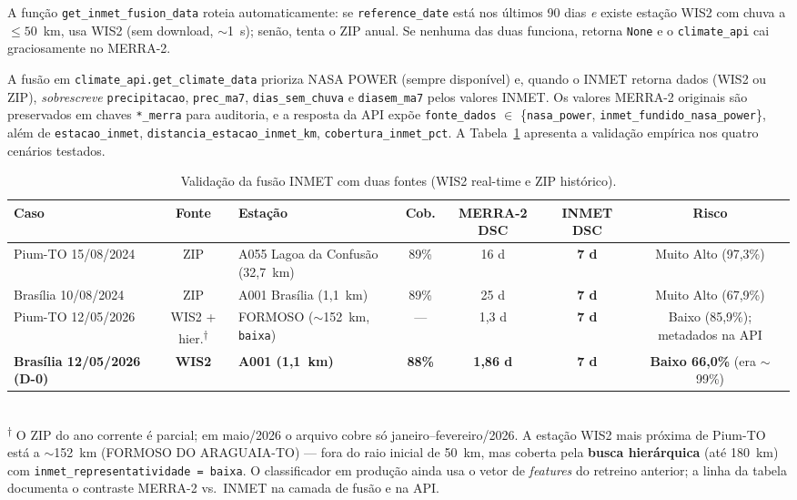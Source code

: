 A função \texttt{get\_inmet\_fusion\_data} roteia automaticamente: se \texttt{reference\_date} está nos últimos 90 dias \emph{e} existe estação WIS2 com chuva a $\leq 50$~km, usa WIS2 (sem download, $\sim$1~s); senão, tenta o ZIP anual. Se nenhuma das duas funciona, retorna \texttt{None} e o \texttt{climate\_api} cai graciosamente no MERRA-2.

A fusão em \texttt{climate\_api.get\_climate\_data} prioriza NASA POWER (sempre disponível) e, quando o INMET retorna dados (WIS2 ou ZIP), \emph{sobrescreve} \texttt{precipitacao}, \texttt{prec\_ma7}, \texttt{dias\_sem\_chuva} e \texttt{diasem\_ma7} pelos valores INMET. Os valores MERRA-2 originais são preservados em chaves \texttt{*\_merra} para auditoria, e a resposta da API expõe \texttt{fonte\_dados} $\in$ \{\texttt{nasa\_power}, \texttt{inmet\_fundido\_nasa\_power}\}, além de \texttt{estacao\_inmet}, \texttt{distancia\_estacao\_inmet\_km}, \texttt{cobertura\_inmet\_pct}. A Tabela~\ref{tab:pium_inmet} apresenta a validação empírica nos quatro cenários testados.

\begin{table}[h]
\centering
\caption{Validação da fusão INMET com duas fontes (WIS2 real-time e ZIP histórico).}
\label{tab:pium_inmet}
\small
\begin{tabular}{p{3cm}cp{2.6cm}cccc}
\toprule
\textbf{Caso} & \textbf{Fonte} & \textbf{Estação} & \textbf{Cob.} & \textbf{MERRA-2 DSC} & \textbf{INMET DSC} & \textbf{Risco} \\
\midrule
Pium-TO 15/08/2024 & ZIP & A055 Lagoa da Confusão (32,7~km) & 89\% & 16 d & \textbf{7 d} & Muito Alto (97,3\%) \\
Brasília 10/08/2024 & ZIP & A001 Brasília (1,1~km) & 89\% & 25 d & \textbf{7 d} & Muito Alto (67,9\%) \\
Pium-TO 12/05/2026 & WIS2 + hier.\textsuperscript{$\dagger$} & FORMOSO ($\sim$152~km, \texttt{baixa}) & --- & 1,3 d & \textbf{7 d} & Baixo (85,9\%); metadados na API \\
\textbf{Brasília 12/05/2026 (D-0)} & \textbf{WIS2} & \textbf{A001 (1,1~km)} & \textbf{88\%} & \textbf{1,86 d} & \textbf{7 d} & \textbf{Baixo 66,0\%} (era $\sim$99\%) \\
\bottomrule
\end{tabular}\\
\footnotesize
\textsuperscript{$\dagger$} O ZIP do ano corrente é parcial; em maio/2026 o arquivo cobre só janeiro--fevereiro/2026. A estação WIS2 mais próxima de Pium-TO está a $\sim$152~km (FORMOSO DO ARAGUAIA-TO) --- fora do raio inicial de 50~km, mas coberta pela \textbf{busca hierárquica} (até 180~km) com \texttt{inmet\_representatividade = baixa}. O classificador em produção ainda usa o vetor de \emph{features} do retreino anterior; a linha da tabela documenta o contraste MERRA-2 vs.\ INMET na camada de fusão e na API.
\end{table}

